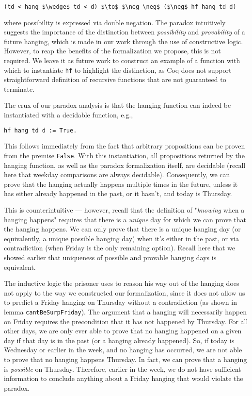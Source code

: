 \documentclass[runningheads]{llncs}
\begin{document}
\begin{lstlisting}[mathescape=true]
    (td < hang $\wedge$ td < d) $\to$ $\neg \neg$ ($\neg$ hf hang td d)
\end{lstlisting}

where possibility is expressed via double negation. The paradox intuitively
suggests the importance of the distinction between \emph{possibility} and \emph{provability}
of a future hanging, which is made in our work through the use of constructive
logic. However, to reap the benefits of the formalization we propose, this is
not required.
We leave it as future work to construct an example of a
function with which to instantiate {\tt hf} to highlight the distinction,
as Coq does not support straightforward definition of recursive functions that are
not guaranteed to terminate.

The crux of our paradox analysis
is that the hanging function can indeed be instantiated with a decidable
function, e.g.,

\begin{lstlisting}[mathescape=true]
    hf hang td d := True.
\end{lstlisting}

This follows immediately from the fact that arbitrary propositions can be proven
from the premise {\tt False}. With this instantiation, all propositions
returned by the hanging function, as well as the paradox formalization itself,
are decidable (recall here that weekday comparisons are always decidable).
Consequently, we can prove that the hanging actually happens
multiple times in the future, unless it has either already happened in the past,
or it hasn't, and today is Thursday.

This is counterintuitive --- however, recall that the
definition of "\emph{knowing} when a hanging happens" requires that there
is a \emph{unique}
day for which we can prove that the hanging happens. We can only prove that
there is a unique hanging day (or equivalently, a unique possible hanging day)
when it's either in the past, or via contradiction (when Friday is the only remaining option).
Recall here that we showed earlier that uniqueness of possible and provable
hanging days is equivalent.

The inductive logic the prisoner uses to reason his way out of the hanging does
not apply to the way we constructed our formalization, since it does not
allow us to predict a Friday hanging on Thursday without a contradiction
(as shown in lemma {\tt cantBeSurpFriday}).
The argument that a hanging will necessarily happen on Friday requires the
precondition that it has not happened by Thursday. For all other days,
we are only ever able to prove
that no hanging happened on a given day if that day is in the past (or a hanging
already happened). So, if today is Wednesday or earlier
in the week, and no hanging has occurred, we are not able to prove that no hanging
happens Thursday. In fact, we can prove that a hanging is \emph{possible} on Thursday.
Therefore, earlier in the week, we do not have sufficient
information to conclude
anything about a Friday hanging that would violate the paradox.
\end{document}
